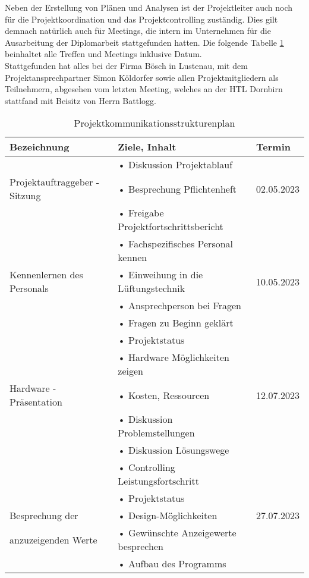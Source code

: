 Neben der Erstellung von Plänen und Analysen ist der Projektleiter auch noch für die Projektkoordination und das Projektcontrolling zuständig. Dies gilt demnach natürlich auch für Meetings, die intern im Unternehmen für die Ausarbeitung der Diplomarbeit stattgefunden hatten. Die folgende Tabelle \ref{tab:strukturenplan} beinhaltet alle Treffen und Meetings inklusive Datum. \\
Stattgefunden hat alles bei der Firma Bösch in Lustenau, mit dem Projektansprechpartner Simon Köldorfer sowie allen Projektmitgliedern als Teilnehmern, abgesehen vom letzten Meeting, welches an der HTL Dornbirn stattfand mit Beisitz von Herrn Battlogg.

\begin{table}[H]
	\caption{Projektkommunikationsstrukturenplan}
	\label{tab:strukturenplan}
	\centering
	\begin{tabular}{p{} | p{} | p{}}
		\toprule
		\textbf{Bezeichnung} & \textbf{Ziele, Inhalt} & \textbf{Termin} \\
		\midrule
			& • Diskussion Projektablauf & \\
		Projektauftraggeber - Sitzung &  • Besprechung Pflichtenheft  & 02.05.2023 \\
 			& • Freigabe Projektfortschrittsbericht & \\
 		\midrule
 			& • Fachspezifisches Personal kennen & \\
 		Kennenlernen des Personals	& • Einweihung in die Lüftungstechnik & 10.05.2023 \\
 			& • Ansprechperson bei Fragen & \\
 			& • Fragen zu Beginn geklärt & \\
 		\midrule
 			& •	Projektstatus & \\
 			& •	Hardware Möglichkeiten zeigen & \\
 		Hardware - Präsentation	& • Kosten, Ressourcen & 12.07.2023 \\ 
 			& • Diskussion Problemstellungen & \\
 			& • Diskussion Lösungswege & \\
 			& •	Controlling Leistungsfortschritt & \\
 		\midrule
 			& •	Projektstatus & \\
 		Besprechung der & •	Design-Möglichkeiten & 27.07.2023 \\
 		anzuzeigenden Werte& •	Gewünschte Anzeigewerte besprechen & \\
 			& • Aufbau des Programms  & \\

\end{tabular}
\end{table}
